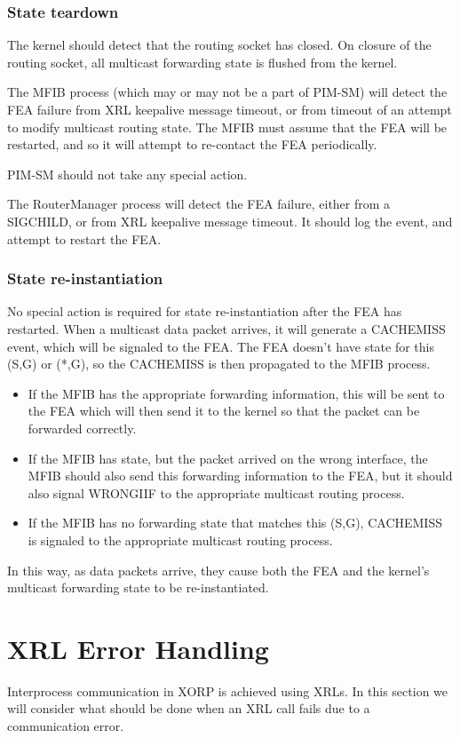 \documentclass[11pt]{article}
\begin{document}
\subsubsection*{State teardown}
The kernel should detect that the routing socket has closed.  On
closure of the routing socket, all multicast forwarding state is
flushed from the kernel.

The MFIB process (which may or may not be a part of PIM-SM) will
detect the FEA failure from XRL keepalive message timeout, or from
timeout of an attempt to modify multicast routing state.  The MFIB
must assume that the FEA will be restarted, and so it will attempt to
re-contact the FEA periodically.

PIM-SM should not take any special action.

The RouterManager process will detect the FEA failure, either from a
SIGCHILD, or from XRL keepalive message timeout.  It should log the
event, and attempt to restart the FEA.

\subsubsection*{State re-instantiation}
No special action is required for state re-instantiation after the FEA
has restarted.  When a multicast data packet arrives, it will generate
a CACHEMISS event, which will be signaled to the FEA.  The FEA
doesn't have state for this (S,G) or (*,G), so the CACHEMISS is then
propagated to the MFIB process. 
\begin{itemize}
\item If the MFIB has the appropriate forwarding information, this
will be sent to the FEA which will then send it to the kernel so that
the packet can be forwarded correctly.  
\item If the MFIB has state, but the packet arrived on the wrong
interface, the MFIB should also send this forwarding information to the
FEA, but it should also signal WRONGIIF to the appropriate multicast
routing process.
\item If the MFIB has no forwarding state that matches this (S,G),
CACHEMISS is signaled to the appropriate multicast routing process.
\end{itemize}
In this way, as data packets arrive, they cause both the FEA and the
kernel's multicast forwarding state to be re-instantiated.

\section*{XRL Error Handling}
Interprocess communication in XORP is achieved using XRLs. In this
section we will consider what should be done when an XRL call fails
due to a communication error.
\end{document}
